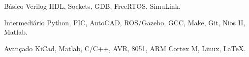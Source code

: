

\begin{cvskills}

  \cvskill
    {Básico} %
    {Verilog HDL, Sockets, GDB, FreeRTOS, SimuLink.} %

  \cvskill
    {Intermediário} %
    {Python, PIC, AutoCAD, ROS/Gazebo, GCC, Make, Git, Nios II, Matlab.} %

  \cvskill
    {Avançado} %
    {KiCad, Matlab, C/C++, AVR, 8051,  ARM Cortex M, Linux, LaTeX.} %

\end{cvskills}




